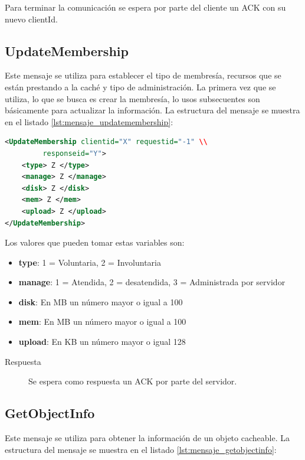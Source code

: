 Para terminar la comunicación se espera por parte del cliente un ACK con su nuevo clientId.

\subsection{UpdateMembership}

Este mensaje se utiliza para establecer el tipo de membresía, recursos que se están prestando a la caché y tipo de administración. La primera vez que se utiliza, lo que se busca es crear la membresía, lo usos subsecuentes son básicamente para actualizar la información. La estructura del mensaje se muestra en el listado \ref{lst:mensaje_updatemembership}:

\begin{lstlisting}[language=XML,caption={Mensaje de UpdateMembership},label={lst:mensaje_updatemembership}]
<UpdateMembership clientid="X" requestid="-1" \\
		 responseid="Y"> 
	<type> Z </type>
	<manage> Z </manage>
	<disk> Z </disk>
	<mem> Z </mem>
	<upload> Z </upload>
</UpdateMembership>
\end{lstlisting}

Los valores que pueden tomar estas variables son:

\begin{itemize}
\item \textbf{type}: 1 = Voluntaria, 2 = Involuntaria
\item \textbf{manage}: 1 = Atendida, 2 = desatendida, 3 = Administrada por servidor
\item \textbf{disk}: En MB un número mayor o igual a 100
\item \textbf{mem}: En MB un número mayor o igual a 100
\item \textbf{upload}: En KB un número mayor o igual 128
\end{itemize}

\begin{description}
\item[Respuesta] Se espera como respuesta un ACK por parte del servidor.
\end{description}

\subsection{GetObjectInfo}
Este mensaje se utiliza para obtener la información de un objeto cacheable. La estructura del mensaje se muestra en el listado \ref{lst:mensaje_getobjectinfo}:

